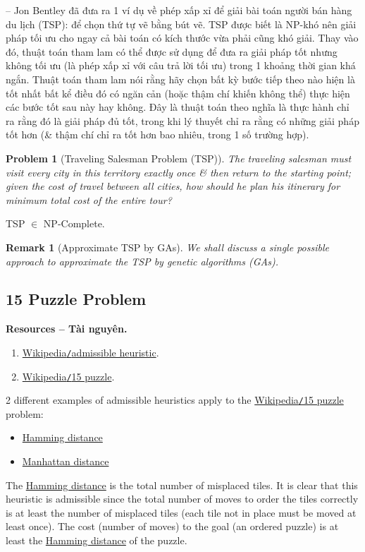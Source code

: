 \documentclass{article}
\newtheorem{problem}{Problem}
\newtheorem{remark}{Remark}
\begin{document}
-- {\sc Jon Bentley} đã đưa ra 1 ví dụ về phép xấp xỉ để giải bài toán người bán hàng du lịch (TSP): để chọn thứ tự vẽ bằng bút vẽ. TSP được biết là NP-khó nên giải pháp tối ưu cho ngay cả bài toán có kích thước vừa phải cũng khó giải. Thay vào đó, thuật toán tham lam có thể được sử dụng để đưa ra giải pháp tốt nhưng không tối ưu (là phép xấp xỉ với câu trả lời tối ưu) trong 1 khoảng thời gian khá ngắn. Thuật toán tham lam nói rằng hãy chọn bất kỳ bước tiếp theo nào hiện là tốt nhất bất kể điều đó có ngăn cản (hoặc thậm chí khiến không thể) thực hiện các bước tốt sau này hay không. Đây là thuật toán theo nghĩa là thực hành chỉ ra rằng đó là giải pháp đủ tốt, trong khi lý thuyết chỉ ra rằng có những giải pháp tốt hơn (\& thậm chí chỉ ra tốt hơn bao nhiêu, trong 1 số trường hợp).

\begin{problem}[Traveling Salesman Problem (TSP)]
	The traveling salesman must visit every city in this territory exactly once \& then return to the starting point; given the cost of travel between all cities, how should he plan his itinerary for minimum total cost of the entire tour?
\end{problem}
TSP $\in$ NP-Complete.

\begin{remark}[Approximate TSP by GAs]
	We shall discuss a single possible approach to approximate the TSP by genetic algorithms (GAs).
\end{remark}


\subsection{15 Puzzle Problem}
\textbf{\textbf{Resources -- Tài nguyên.}}
\begin{enumerate}
	\item \href{https://en.wikipedia.org/wiki/Admissible_heuristic}{Wikipedia{\tt/}admissible heuristic}.
	\item \href{https://en.wikipedia.org/wiki/Fifteen_puzzle}{Wikipedia{\tt/}15 puzzle}.
\end{enumerate}
2 different examples of admissible heuristics apply to the \href{https://en.wikipedia.org/wiki/Fifteen_puzzle}{Wikipedia{\tt/}15 puzzle} problem:
\begin{itemize}
	\item \href{https://en.wikipedia.org/wiki/Hamming_distance}{Hamming distance}
	\item \href{https://en.wikipedia.org/wiki/Manhattan_distance}{Manhattan distance}
\end{itemize}
The \href{https://en.wikipedia.org/wiki/Hamming_distance}{Hamming distance} is the total number of misplaced tiles. It is clear that this heuristic is admissible since the total number of moves to order the tiles correctly is at least the number of misplaced tiles (each tile not in place must be moved at least once). The cost (number of moves) to the goal (an ordered puzzle) is at least the \href{https://en.wikipedia.org/wiki/Hamming_distance}{Hamming distance} of the puzzle.
\end{document}
